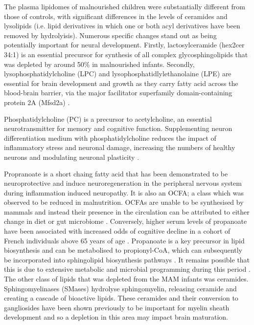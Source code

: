 \documentclass{article}
\begin{document}
The plasma lipidomes of malnourished children were substantially different from those of controls, with significant differences in the levels of ceramides and lysolipids (i.e. lipid derivatives in which one or both acyl derivatives have been removed by hydrolyisis).
Numerous specific changes stand out as being potentially important for neural development.
Firstly, lactosylceramide (hex2cer 34:1) is an essential precursor for synthesis of all complex glycosphingolipids \cite{d2013glycosphingolipids} that was depleted by around 50\% in malnourished infants.
Secondly, lysophosphatidylcholine (LPC) and lysophosphatidlylethanolaine (LPE) are essential for brain development and growth as they carry fatty acid across the blood-brain barrier, via the major facilitator superfamily domain-containing protein 2A (Mfsd2a) \cite{tan2020emerging}.  

Phosphatidylcholine (PC) is a precursor to acetylcholine, an essential neurotransmitter for memory and cognitive function.
Supplementing neuron differentiation medium with phosphatidylcholine reduces the impact of inflammatory stress and neuronal damage, increasing the numbers of healthy neurons and modulating neuronal plasticity \cite{magaquian2021phosphatidylcholine}. 

Propranoate is a short chaing fatty acid that has been demonstrated to be neuroprotective and induce neuroregeneration in the peripheral nervous system during inflammation induced neuropathy.
It is also an \gls{OCFA}; a class which was observed to be reduced in malnutrition.
\glspl{OCFA} are unable to be synthesised by mammals and instead their presence in the circulation can be attributed to either change in diet or gut microbiome \cite{zhang2020microbial}.
Conversely, higher serum levels of propanoate have been associated with increased odds of cognitive decline in a cohort of French individuals above 65 years of age \cite{neuffer2022exploration, gruter2023propionate}.
Propanoate is a key precursor in lipid biosynthesis and can be metabolised to propionyl-CoA, which can subsequently be incorporated into sphingolipid biosynthesis pathways \cite{kondo2014identification}. 
It remains possible that this is due to extensive metabolic and microbial programming during this period \cite{mahmud2019decoding}. 
The other class of lipids that was depleted from the \gls{MAM} infants was ceramides.
Sphingomyelinases (SMases) hydrolyse sphingomyelin, releasing ceramide and creating a cascade of bioactive lipids. 
These ceramides and their conversion to gangliosides have been shown previously to be important for myelin sheath development and so a depletion in this area may impact brain maturation.
\end{document}
